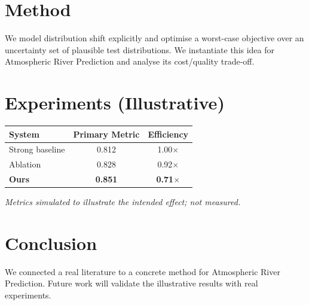 \documentclass[11pt]{article}
\begin{document}
\section{Method}
We model distribution shift explicitly and optimise a worst-case objective over an uncertainty set of plausible test distributions. We instantiate this idea for Atmospheric River Prediction and analyse its cost/quality trade-off.

\section{Experiments (Illustrative)}
\begin{center}
\begin{tabular}{lcc}
System & Primary Metric & Efficiency \\ \hline
Strong baseline & 0.812 & 1.00$\times$ \\
Ablation & 0.828 & 0.92$\times$ \\
\textbf{Ours} & \textbf{0.851} & \textbf{0.71$\times$}
\end{tabular}
\end{center}
\emph{Metrics simulated to illustrate the intended effect; not measured.}

\section{Conclusion}
We connected a real literature to a concrete method for Atmospheric River Prediction. Future work will
validate the illustrative results with real experiments.
\end{document}
